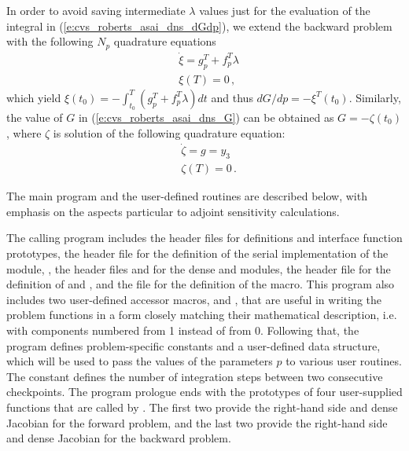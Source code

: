 In order to avoid saving intermediate $\lambda$ values just for the
evaluation of the integral in (\ref{e:cvs_roberts_asai_dns_dGdp}), we extend the
backward problem with the following $N_p$ quadrature equations
\begin{equation}\label{e:cvs_roberts_asai_dns_XI}
  \begin{split}
    &{\dot\xi} = g_p^T + f_p^T \lambda \\
    &\xi (T) = 0 \, ,
  \end{split}
\end{equation}
which yield $\xi(t_0) = - \int_{t_0}^{T} ( g_p^T + f_p^T \lambda) dt$
and thus ${dG}/{dp} = -\xi^T(t_0)$.
Similarly, the value of $G$ in (\ref{e:cvs_roberts_asai_dns_G}) can be obtained as
$G = - \zeta(t_0)$, where $\zeta$ is solution of the following quadrature
equation:
\begin{equation}\label{e:cvs_roberts_asai_dns_ZETA}
  \begin{split}
    &{\dot\zeta} = g = y_3 \\
    &\zeta(T) = 0 \, .
  \end{split}
\end{equation}

The main program and the user-defined routines are described below, 
with emphasis on the aspects particular to adjoint sensitivity calculations.

The calling program includes the {\cvodes} header files  
for {\cvodes} definitions and interface function prototypes,
the header file  for the definition of the serial implementation
of the {\nvector} module, {\nvecs}, the header files
 and  for the dense
{\sunmatrix} and {\sunlinsol} modules, the header file
 for the definition of  and ,
and the file  for the
definition of the  macro.
This program also includes two user-defined accessor macros,  and ,
that are useful in writing the problem functions in a form closely matching their
mathematical description, i.e. with components numbered from 1 instead of from 0. 
Following that, the program defines problem-specific constants and a user-defined 
data structure, which will be used to pass the values of the parameters $p$ to various
user routines. The constant  defines the number of integration steps
between two consecutive checkpoints.
The program prologue ends with the prototypes of four user-supplied functions that are
called by {\cvodes}. The first two provide the right-hand side and dense Jacobian
for the forward problem, and the last two provide the right-hand side and dense
Jacobian for the backward problem.


